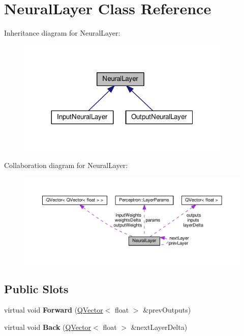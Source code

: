 \hypertarget{class_neural_layer}{}\section{Neural\+Layer Class Reference}
\label{class_neural_layer}


Inheritance diagram for Neural\+Layer\+:\nopagebreak
\begin{figure}[H]
\begin{center}
\leavevmode
\includegraphics[width=287pt]{class_neural_layer__inherit__graph}
\end{center}
\end{figure}


Collaboration diagram for Neural\+Layer\+:\nopagebreak
\begin{figure}[H]
\begin{center}
\leavevmode
\includegraphics[width=350pt]{class_neural_layer__coll__graph}
\end{center}
\end{figure}
\subsection*{Public Slots}
\begin{DoxyCompactItemize}
\item 
virtual void {\bfseries Forward} (\hyperlink{class_q_vector}{Q\+Vector}$<$ float $>$ \&prev\+Outputs)\hypertarget{class_neural_layer_ab314d73699d84855b5611ffd9b526da2}{}\label{class_neural_layer_ab314d73699d84855b5611ffd9b526da2}

\item 
virtual void {\bfseries Back} (\hyperlink{class_q_vector}{Q\+Vector}$<$ float $>$ \&next\+Layer\+Delta)\hypertarget{class_neural_layer_a05fc717e06e6f287d5b1e8ea69f56727}{}\label{class_neural_layer_a05fc717e06e6f287d5b1e8ea69f56727}

\end{DoxyCompactItemize}
